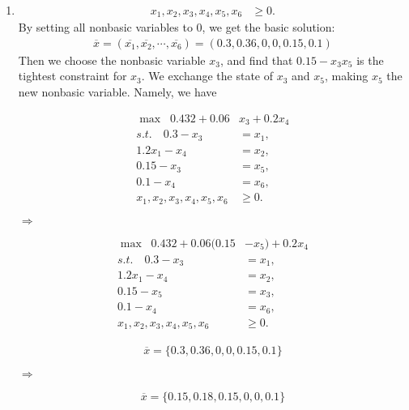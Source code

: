 \documentclass[12pt,a4paper]{article}
\makeatletter
\newtheorem*{solution}{Solution}
\theoremstyle{definition}
\renewenvironment{solution}[1][Solution] {\par\pushQED{\qed}\normalfont\topsep6\p@\@plus6\p@\relax\trivlist\item[\hskip\labelsep\bfseries#1\@addpunct{.}]\ignorespaces}{\popQED\endtrivlist\@endpefalse} \makeatother
\makeatother
\begin{document}
\begin{enumerate}
\begin{solution}
\begin{enumerate}
\begin{align*}
		x_1,x_2,x_3,x_4,x_5,x_6&\geq0.
	\end{align*}
	 By setting all nonbasic variables to 0, we get the basic solution:
	\begin{align*}
		\overline{x}=(\overline{x_1},\overline{x_2},\cdots,\overline{x_6})=(0.3,0.36,0,0,0.15,0.1)
	\end{align*}
	Then we choose the nonbasic variable $x_3$, and find that $0.15-x_3x_5$ is the tightest constraint for $x_3$. We exchange the state of $x_3$ and $x_5$, making $x_5$ the new nonbasic variable. Namely, we have\newline
	\begin{minipage}{0.45\textwidth}
		\begin{align*}
		\max\;\; 0.432+0.06&x_3+0.2x_4\\
		s.t. \quad 0.3-x_3&=x_1,\\
		1.2x_1-x_4&=x_2,\\
		0.15-x_3&=x_5,\\
		0.1-x_4&=x_6,\\
		x_1,x_2,x_3,x_4,x_5,x_6&\geq0.
		\end{align*} 
	\end{minipage}
	$\Rightarrow$
	\begin{minipage}{0.45\textwidth}
		\begin{align*}
		\max\;\; 0.432+0.06(0.15&-x_5)+0.2x_4\\
		s.t. \quad 0.3-x_3&=x_1,\\
		1.2x_1-x_4&=x_2,\\
		0.15-x_5&=x_3,\\
		0.1-x_4&=x_6,\\
		x_1,x_2,x_3,x_4,x_5,x_6&\geq0.
		\end{align*} 
	\end{minipage}
		\begin{minipage}{0.45\textwidth}
			\begin{align*}
			\overline{x}=\{0.3,0.36,0,0,0.15,0.1\}
			\end{align*} 
		\end{minipage}
		$\Rightarrow$
		\begin{minipage}{0.45\textwidth}
			\begin{align*}
			\overline{x}=\{0.15,0.18,0.15,0,0,0.1\}
			\end{align*} 
		\end{minipage}
		

\end{enumerate}
\end{solution}
\end{enumerate}
\end{document}
